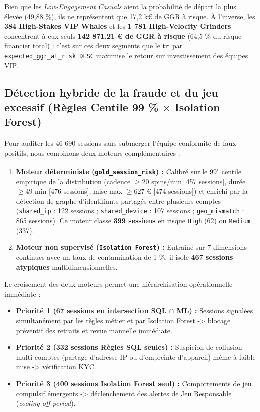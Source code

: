 \documentclass[11pt,a4paper]{article}
\begin{document}
Bien que les \textit{Low-Engagement Casuals} aient la probabilité de départ la plus élevée (49,88 \%), ils ne représentent que 17,2 k\euro{} de GGR à risque. À l'inverse, les \textbf{384 High-Stakes VIP Whales} et les \textbf{1 781 High-Velocity Grinders} concentrent à eux seuls \textbf{142 871,21 \euro{} de GGR à risque} (64,5 \% du risque financier total) : c'est sur ces deux segments que le tri par \texttt{expected\_ggr\_at\_risk DESC} maximise le retour sur investissement des équipes VIP.

\subsection{Détection hybride de la fraude et du jeu excessif (Règles Centile 99 \% $\times$ Isolation Forest)}
Pour auditer les 46 690 sessions sans submerger l'équipe conformité de faux positifs, nous combinons deux moteurs complémentaires :
\begin{enumerate}
    \item \textbf{Moteur déterministe (\texttt{gold\_session\_risk}) :} Calibré sur le 99\textsuperscript{e} centile empirique de la distribution (cadence $\ge 20$ spins/min [457 sessions], durée $\ge 49$ min [476 sessions], mise max $\ge 627$ \euro{} [474 sessions]) et enrichi par la détection de graphe d'identifiants partagés entre plusieurs comptes (\texttt{shared\_ip} : 122 sessions ; \texttt{shared\_device} : 107 sessions ; \texttt{geo\_mismatch} : 865 sessions). Ce moteur classe \textbf{399 sessions} en risque \texttt{High} (62) ou \texttt{Medium} (337).
    \item \textbf{Moteur non supervisé (\texttt{Isolation Forest}) :} Entraîné sur 7 dimensions continues avec un taux de contamination de 1 \%, il isole \textbf{467 sessions atypiques} multidimensionnelles.
\end{enumerate}

Le croisement des deux moteurs permet une hiérarchisation opérationnelle immédiate :
\begin{itemize}
    \item \textbf{Priorité 1 (67 sessions en intersection SQL $\cap$ ML) :} Sessions signalées simultanément par les règles métier et par Isolation Forest -> blocage préventif des retraits et revue manuelle immédiate.
    \item \textbf{Priorité 2 (332 sessions Règles SQL seules) :} Suspicion de collusion multi-comptes (partage d'adresse IP ou d'empreinte d'appareil) même à faible mise -> vérification KYC.
    \item \textbf{Priorité 3 (400 sessions Isolation Forest seul) :} Comportements de jeu compulsif émergents -> déclenchement des alertes de Jeu Responsable (\textit{cooling-off period}).
\end{itemize}
\end{document}

